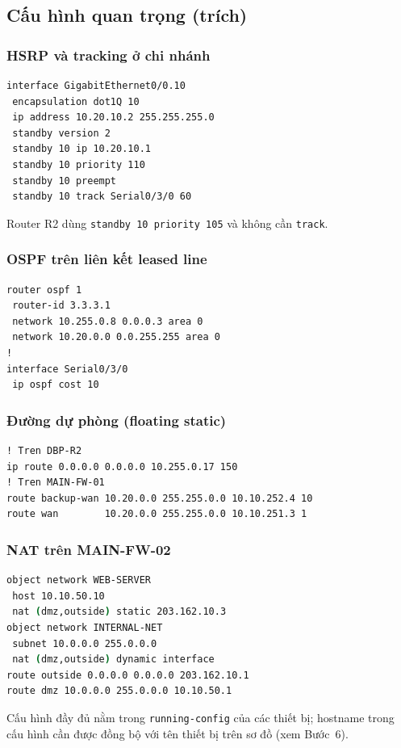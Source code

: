 \subsection{Cấu hình quan trọng (trích)}

\subsubsection{HSRP và tracking ở chi nhánh}
\begin{lstlisting}[language=csh,caption={Subinterface VLAN 10 trên router chính chi nhánh}]
interface GigabitEthernet0/0.10
 encapsulation dot1Q 10
 ip address 10.20.10.2 255.255.255.0
 standby version 2
 standby 10 ip 10.20.10.1
 standby 10 priority 110
 standby 10 preempt
 standby 10 track Serial0/3/0 60
\end{lstlisting}
Router R2 dùng \texttt{standby 10 priority 105} và không cần \texttt{track}.

\subsubsection{OSPF trên liên kết leased line}
\begin{lstlisting}[language=csh,caption={OSPF trên DBP-R1}]
router ospf 1
 router-id 3.3.3.1
 network 10.255.0.8 0.0.0.3 area 0
 network 10.20.0.0 0.0.255.255 area 0
!
interface Serial0/3/0
 ip ospf cost 10
\end{lstlisting}

\subsubsection{Đường dự phòng (floating static)}
\begin{lstlisting}[language=csh,caption={Floating static tại chi nhánh và route trên MAIN-FW-01}]
! Tren DBP-R2
ip route 0.0.0.0 0.0.0.0 10.255.0.17 150
! Tren MAIN-FW-01
route backup-wan 10.20.0.0 255.255.0.0 10.10.252.4 10
route wan        10.20.0.0 255.255.0.0 10.10.251.3 1
\end{lstlisting}

\subsubsection{NAT trên MAIN-FW-02}
\begin{lstlisting}[language=csh,caption={Static NAT và PAT trên MAIN-FW-02}]
object network WEB-SERVER
 host 10.10.50.10
 nat (dmz,outside) static 203.162.10.3
object network INTERNAL-NET
 subnet 10.0.0.0 255.0.0.0
 nat (dmz,outside) dynamic interface
route outside 0.0.0.0 0.0.0.0 203.162.10.1
route dmz 10.0.0.0 255.0.0.0 10.10.50.1
\end{lstlisting}
\noindent Cấu hình đầy đủ nằm trong \texttt{running-config} của các thiết bị; hostname trong cấu hình cần được đồng bộ với tên thiết bị trên sơ đồ (xem Bước~6).

